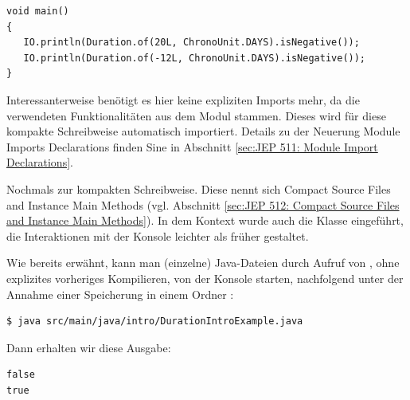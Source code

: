 \vspace{-0.75mm}
\begin{lstlisting}
void main()
{
   IO.println(Duration.of(20L, ChronoUnit.DAYS).isNegative());
   IO.println(Duration.of(-12L, ChronoUnit.DAYS).isNegative());
}
\end{lstlisting}
\vspace{-0.75mm}


Interessanterweise benötigt es hier keine expliziten Imports mehr, da
die verwendeten Funktionalitäten aus dem Modul  stammen.
Dieses wird für diese kompakte Schreibweise automatisch importiert.
Details zu der Neuerung Module Imports Declarations finden
Sine in Abschnitt \ref{sec:JEP 511: Module Import Declarations}.


Nochmals zur kompakten Schreibweise. Diese nennt sich
Compact Source Files and Instance Main Methods
 (vgl. Abschnitt \ref{sec:JEP 512: Compact Source Files and Instance Main Methods}).
In dem Kontext wurde auch die Klasse  eingeführt, die Interaktionen
mit der Konsole leichter als früher gestaltet.


Wie bereits erwähnt, kann man (einzelne) Java-Dateien durch Aufruf von ,
ohne explizites vorheriges Kompilieren, von der Konsole starten, nachfolgend unter
der Annahme einer Speicherung in einem Ordner :


\vspace{-0.75mm}
\begin{lstlisting}
$ java src/main/java/intro/DurationIntroExample.java
\end{lstlisting}
\vspace{-0.75mm}


\noindent
Dann erhalten wir diese Ausgabe:


\vspace{-0.5mm}
\begin{lstlisting}
false
true
\end{lstlisting}
\vspace{-0.5mm}








